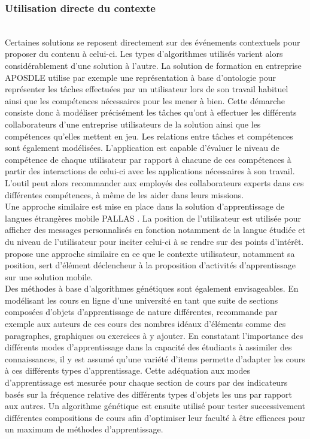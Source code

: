 \documentclass[conference]{./sty/IEEEtran}
\begin{document}
\subsubsection{Utilisation directe du contexte}
~\\
Certaines solutions se reposent directement sur des événements contextuels
pour proposer du contenu à celui-ci. Les types d'algorithmes utilisés varient
alors considérablement d'une solution à l'autre. La solution de formation en
entreprise APOSDLE utilise par exemple une représentation à base d'ontologie
pour représenter les tâches effectuées par un utilisateur lors de son travail
habituel ainsi que les compétences nécessaires pour les mener à
bien\cite{DBLP:journals/procedia/BehamKLL10}. Cette démarche consiste donc à
modéliser précisément les tâches qu'ont à effectuer les différents
collaborateurs d'une entreprise utilisateurs de la solution ainsi que les
compétences qu'elles mettent en jeu. Les relations entre tâches et compétences
sont également modélisées. L'application est capable d'évaluer le niveau de
compétence de chaque utilisateur par rapport à chacune de ces compétences à
partir des interactions de celui-ci avec les applications nécessaires à son
travail. L'outil peut alors recommander aux employés des collaborateurs experts
dans ces différentes compétences, à même de les aider dans leurs missions. \\

Une approche similaire est mise en place dans la solution d'apprentissage de
langues étrangères mobile PALLAS \cite{DBLP:conf/wmte/PetersenM06}. La position
de l'utilisateur est utilisée pour afficher des messages personnalisés en
fonction notamment de la langue étudiée et du niveau de l'utilisateur pour
inciter celui-ci à se rendre sur des points d'intérêt.
\cite{Kurti:2008:CMS:1456223.1456331} propose une approche similaire en ce que
le contexte utilisateur, notamment sa position, sert d'élément déclencheur à la
proposition d'activités d'apprentissage sur une solution mobile. \\

Des méthodes à base d'algorithmes génétiques sont également envisageables. En
modélisant les cours en ligne d'une université en tant que suite de sections
composées d'objets d'apprentissage de nature différentes,
\cite{smartECourseRecommander} recommande par exemple aux auteurs de ces cours
des nombres idéaux d'éléments comme des paragraphes, graphiques ou exercices à
y ajouter. En constatant l'importance des différents modes d'apprentissage dans
la capacité des étudiants à assimiler des connaissances, il y est assumé qu'une
variété d'items permette d'adapter les cours à ces différents types
d'apprentissage. Cette adéquation aux modes d'apprentissage est mesurée pour
chaque section de cours par des indicateurs basés sur la fréquence relative des
différents types d'objets les uns par rapport aux autres. Un algorithme
génétique est ensuite utilisé pour tester successivement différentes
compositions de cours afin d'optimiser leur faculté à être efficaces pour un
maximum de méthodes d'apprentissage. \\
\end{document}
